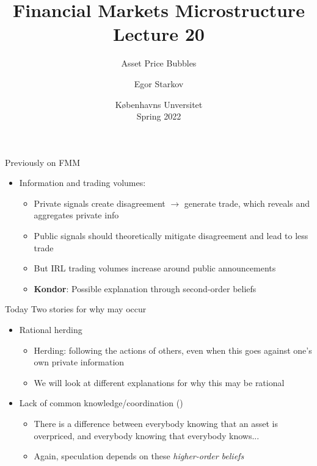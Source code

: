 \documentclass[english,10pt
,aspectratio=169
]{beamer}
\title{Financial Markets Microstructure \\ Lecture 20}
\subtitle{Asset Price Bubbles}
\author{Egor Starkov}
\date{K{\o}benhavns Unversitet \\
	Spring 2022}
\begin{document}
	\frame[plain]{\titlepage}



\begin{frame}{Previously on FMM}
	\begin{itemize}
		\item Information and trading volumes:
		\begin{itemize}
			\item Private signals create disagreement $\to$ generate trade, which reveals and aggregates private info
			\item Public signals should theoretically mitigate disagreement and lead to less trade
			\item But IRL trading volumes increase around public announcements
			\item \textbf{Kondor}: Possible explanation through second-order beliefs
		\end{itemize}
	\end{itemize}
\end{frame}	


\begin{frame}{Today}
	Two stories for why  may occur
	\begin{itemize}
		\item Rational herding
		\begin{itemize}
			\item Herding: following the actions of others, even when this goes against one's own private information
			\item We will look at different explanations for why this may be rational
		\end{itemize}
		\item Lack of common knowledge/coordination (\cite{abreu_bubbles_2003})
		\begin{itemize}
			\item There is a difference between everybody knowing that an asset is overpriced, and everybody knowing that everybody knows...
			\item Again, speculation depends on these \emph{higher-order beliefs}
		\end{itemize}
	\end{itemize}
\end{frame}
\end{document}
